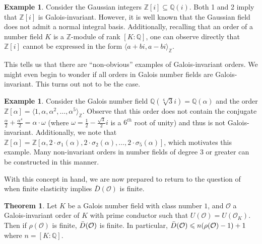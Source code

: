 \documentclass{amsart}
\theoremstyle{definition}
\newtheorem{thm}[lem]{Theorem}
\newtheorem{ex}[lem]{Example}
\newcommand{\MO}{\mathcal{O}}
\newcommand{\bbz}{\mathbb{Z}}
\newcommand{\bbq}{\mathbb{Q}}
\renewcommand{\leq}{\leqslant}
\numberwithin{equation}{section}
\begin{document}
\begin{ex}
    Consider the Gaussian integers $\bbz[i] \subseteq \bbq(i)$. Both 1 and 2 imply that $\bbz[i]$ is Galois-invariant. However, it is well known that the Gaussian field does not admit a normal integral basis. Additionally, recalling that an order of a number field $K$ is a $\bbz$-module of rank $[K:\bbq]$, one can observe directly that $\bbz[i]$ cannot be expressed in the form $\langle a + bi, a- bi \rangle_\bbz$.
\end{ex}

This tells us that there are \enquote{non-obvious} examples of Galois-invariant orders. We might even begin to wonder if all orders in Galois number fields are Galois-invariant. This turns out not to be the case.

\begin{ex}
    Consider the Galois number field $\bbq(\sqrt[6]{3}i) = \bbq(\alpha)$ and the order $\bbz[\alpha] = \langle 1,\alpha, \alpha^2, \dots ,\alpha^5\rangle_\bbz$. Observe that this order does not contain the conjugate $\frac{\alpha}{2} + \frac{\alpha^4}{2} = \alpha \cdot \omega$ (where $\omega = \frac{1}{2}-\frac{\sqrt{3}}{2}i$ is a $6^{th}$ root of unity) and thus is not Galois-invariant. Additionally, we note that $\bbz[\alpha] = \bbz[\alpha, 2\cdot \sigma_1(\alpha), 2\cdot \sigma_2(\alpha), \dots, 2 \cdot \sigma_5(\alpha)]$, which motivates this example. Many non-invariant orders in number fields of degree $3$ or greater can be constructed in this manner. 

\end{ex}

With this concept in hand, we are now prepared to return to the question of when finite elasticity implies $\bar{D}(\MO)$ is finite.

\begin{thm}
    Let $K$ be a Galois number field with class number $1$, and $\MO$ a Galois-invariant order of $K$ with prime conductor such that $U(\MO) = U(\MO_K)$. Then if $\rho(\MO)$ is finite, $\Bar{D}(\MO)$ is finite. In particular, $\Bar{D}(\MO) \leq n(\rho(\MO) - 1) + 1$ where $n = [K:\bbq]$.
\end{thm}
\end{document}
